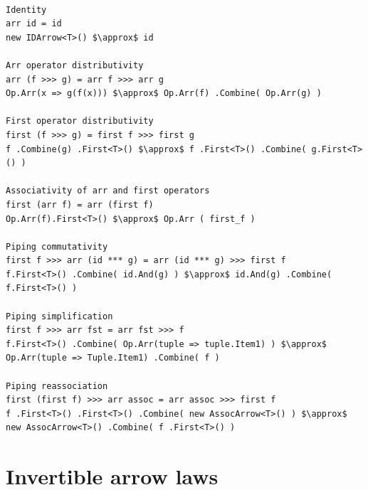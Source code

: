 \documentclass[12pt,twoside,notitlepage]{report}
\begin{document}
\begin{samepage}
\begin{lstlisting}[mathescape]

Identity
arr id = id
new IDArrow<T>() $\approx$ id

Arr operator distributivity
arr (f >>> g) = arr f >>> arr g
Op.Arr(x => g(f(x))) $\approx$ Op.Arr(f) .Combine( Op.Arr(g) )

First operator distributivity
first (f >>> g) = first f >>> first g
f .Combine(g) .First<T>() $\approx$ f .First<T>() .Combine( g.First<T>() )

Associativity of arr and first operators
first (arr f) = arr (first f)
Op.Arr(f).First<T>() $\approx$ Op.Arr ( first_f )

Piping commutativity
first f >>> arr (id *** g) = arr (id *** g) >>> first f
f.First<T>() .Combine( id.And(g) ) $\approx$ id.And(g) .Combine( f.First<T>() )

Piping simplification
first f >>> arr fst = arr fst >>> f
f.First<T>() .Combine( Op.Arr(tuple => tuple.Item1) ) $\approx$ Op.Arr(tuple => Tuple.Item1) .Combine( f )

Piping reassociation
first (first f) >>> arr assoc = arr assoc >>> first f
f .First<T>() .First<T>() .Combine( new AssocArrow<T>() ) $\approx$ new AssocArrow<T>() .Combine( f .First<T>() )

\end{lstlisting}
\end{samepage}

\section{Invertible arrow laws} \label{sec:invertible_arrow_laws}
\end{document}
